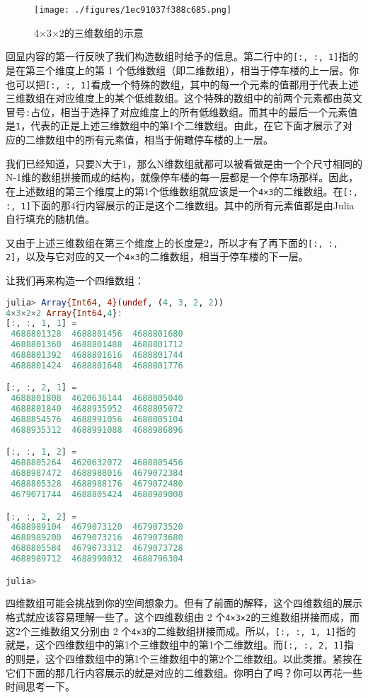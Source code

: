 \begin{figure}[ht]
\centering
\texttt{[image: ./figures/1ec91037f388c685.png]}
\caption{4×3×2的三维数组的示意} \label{fig_JuC9S3_1}
\end{figure}


回显内容的第一行反映了我们构造数组时给予的信息。第二行中的\verb|[:, :, 1]|指的是在第三个维度上的第 1 个低维数组（即二维数组），相当于停车楼的上一层。你也可以把\verb|[:, :, 1]|看成一个特殊的数组，其中的每一个元素的值都用于代表上述三维数组在对应维度上的某个低维数组。这个特殊的数组中的前两个元素都由英文冒号\verb|:|占位，相当于选择了对应维度上的所有低维数组。而其中的最后一个元素值是\verb|1|，代表的正是上述三维数组中的第1个二维数组。由此，在它下面才展示了对应的二维数组中的所有元素值，相当于俯瞰停车楼的上一层。

我们已经知道，只要N大于1，那么N维数组就都可以被看做是由一个个尺寸相同的N-1维的数组拼接而成的结构，就像停车楼的每一层都是一个停车场那样。因此，在上述数组的第三个维度上的第1个低维数组就应该是一个\verb|4×3|的二维数组。在\verb|[:, :, 1]|下面的那4行内容展示的正是这个二维数组。其中的所有元素值都是由Julia自行填充的随机值。

又由于上述三维数组在第三个维度上的长度是2，所以才有了再下面的\verb|[:, :, 2]|，以及与它对应的又一个\verb|4×3|的二维数组，相当于停车楼的下一层。

让我们再来构造一个四维数组：

\begin{lstlisting}[language=julia]
julia> Array{Int64, 4}(undef, (4, 3, 2, 2))
4×3×2×2 Array{Int64,4}:
[:, :, 1, 1] =
 4688801328  4688801456  4688801680
 4688801360  4688801488  4688801712
 4688801392  4688801616  4688801744
 4688801424  4688801648  4688801776

[:, :, 2, 1] =
 4688801808  4620636144  4688805040
 4688801840  4688935952  4688805072
 4688854576  4688991056  4688805104
 4688935312  4688991088  4688986896

[:, :, 1, 2] =
 4688805264  4620632072  4688805456
 4688987472  4688988016  4679072384
 4688805328  4688988176  4679072480
 4679071744  4688805424  4688989008

[:, :, 2, 2] =
 4688989104  4679073120  4679073520
 4688989200  4679073216  4679073680
 4688805584  4679073312  4679073728
 4688989712  4688990032  4688796304

julia> 
\end{lstlisting}

四维数组可能会挑战到你的空间想象力。但有了前面的解释，这个四维数组的展示格式就应该容易理解一些了。这个四维数组由 2 个\verb|4×3×2|的三维数组拼接而成，而这2个三维数组又分别由 2 个\verb|4×3|的二维数组拼接而成。所以，\verb|[:, :, 1, 1]|指的就是，这个四维数组中的第1个三维数组中的第1个二维数组。而\verb|[:, :, 2, 1]|指的则是，这个四维数组中的第1个三维数组中的第2个二维数组。以此类推。紧挨在它们下面的那几行内容展示的就是对应的二维数组。你明白了吗？你可以再花一些时间思考一下。


